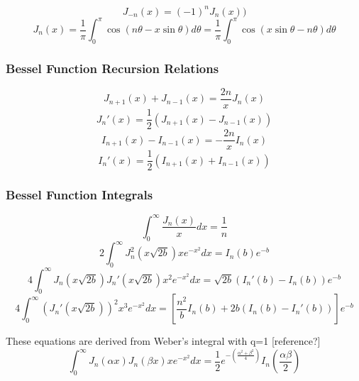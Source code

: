 \begin{equation}
	J_{-n}(x) = (-1)^nJ_n(x))
\end{equation}
\begin{equation}
	J_n(x) = \frac{1}{\pi} \int_0^\pi \cos\left(n\theta - x \sin \theta \right)d\theta = \frac{1}{\pi} \int_0^\pi \cos \left( x \sin \theta - n \theta \right) d\theta
\end{equation}

\subsubsection{Bessel Function Recursion Relations}
\begin{equation}
	J_{n+1}(x) + J_{n-1}(x) = \frac{2n}{x}J_n(x)
\end{equation}
\begin{equation}
	J_n'(x) = \frac{1}{2} \left( J_{n+1}(x) - J_{n-1}(x) \right)
\end{equation}
\begin{equation}
	I_{n+1}(x) - I_{n-1}(x) = -\frac{2n}{x}I_n(x)
\end{equation}
\begin{equation}
	I_n'(x) = \frac{1}{2} \left( I_{n+1}(x) + I_{n-1}(x) \right)
\end{equation}

\subsubsection{Bessel Function Integrals}
\begin{equation}
	\int_0^\infty \frac{J_n (x)}{x} dx = \frac{1}{n}
\end{equation}
\begin{equation}\label{bessel_int_jn2}
	2\int_0^\infty J_n^2 \left( x \sqrt{2b} \right) x e^{-x^2} dx = I_n(b) e^{-b}
\end{equation}
\begin{equation}\label{bessel_int_jn_jn_prime}
	4\int_0^\infty J_n \left( x \sqrt{2b} \right) J_n' \left( x \sqrt{2b} \right) x^2 e^{-x^2} dx = \sqrt{2b} \left(I_n'(b) - I_n(b) \right) e^{-b}
\end{equation}
\begin{equation}\label{bessel_int_jn_prime2}
	4\int_0^\infty \left(J_n' \left( x \sqrt{2b} \right) \right)^2 x^3 e^{-x^2} dx = \left[ \frac{n^2}{b}I_n(b) + 2b \left( I_n(b) - I_n'(b) \right) \right] e^{-b}
\end{equation}

These equations are derived from Weber's integral with q=1 [reference?]
\begin{equation}\label{weber_integral}
	\int_0^\infty J_n \left(\alpha x \right) J_n \left( \beta x \right) xe^{-x^2} dx = \frac{1}{2} e^{-\left( \frac{ \alpha^2 + \beta^2 }{4} \right)} I_n \left( \frac{\alpha \beta}{2} \right)
\end{equation}

